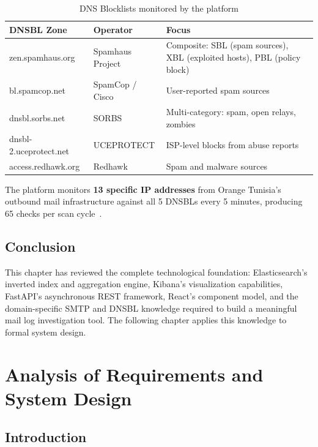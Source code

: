 \documentclass[12pt,a4paper,oneside]{report}
\newcommand{\rowA}{\rowcolor{rowgray}}
\begin{document}
\begin{table}[H]
\centering
\caption{DNS Blocklists monitored by the platform}
\label{tab:dnsbls}
\begin{tabularx}{\textwidth}{@{}>{\ttfamily}p{4.8cm} p{3.2cm} X@{}}
\toprule
\textnormal{DNSBL Zone} & Operator & Focus \\
\midrule
\rowA zen.spamhaus.org & Spamhaus Project & Composite: SBL (spam sources), XBL (exploited hosts), PBL (policy block) \\
bl.spamcop.net & SpamCop / Cisco & User-reported spam sources \\
\rowA dnsbl.sorbs.net & SORBS & Multi-category: spam, open relays, zombies \\
dnsbl-2.uceprotect.net & UCEPROTECT & ISP-level blocks from abuse reports \\
\rowA access.redhawk.org & Redhawk & Spam and malware sources \\
\bottomrule
\end{tabularx}
\end{table}

The platform monitors \textbf{13 specific IP addresses} from Orange Tunisia's outbound mail infrastructure against all 5 DNSBLs every 5 minutes, producing 65 checks per scan cycle~\cite{dnspythonDocs}.

\section{Conclusion}

This chapter has reviewed the complete technological foundation: Elasticsearch's inverted index and aggregation engine, Kibana's visualization capabilities, FastAPI's asynchronous REST framework, React's component model, and the domain-specific SMTP and DNSBL knowledge required to build a meaningful mail log investigation tool.
The following chapter applies this knowledge to formal system design.

\chapter{Analysis of Requirements and System Design}

\section{Introduction}
\end{document}
